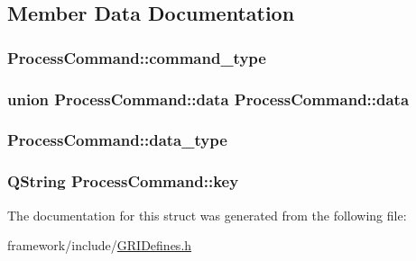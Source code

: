 \subsection{\-Member \-Data \-Documentation}
\hypertarget{structProcessCommand_afd8289b0435d3562920eb84a543bc88b}{
\subsubsection[{command\-\_\-type}]{ {\bf \-Process\-Command\-::command\-\_\-type}}}\label{structProcessCommand_afd8289b0435d3562920eb84a543bc88b}
\hypertarget{structProcessCommand_acc38e81f24ae355107ba38783ef6072a}{
\subsubsection[{data}]{\setlength{\rightskip}{0pt plus 5cm}union {\bf \-Process\-Command\-::data}  {\bf \-Process\-Command\-::data}}}\label{structProcessCommand_acc38e81f24ae355107ba38783ef6072a}
\hypertarget{structProcessCommand_ab1d813eb015c2f47b403c295398a2c77}{
\subsubsection[{data\-\_\-type}]{ {\bf \-Process\-Command\-::data\-\_\-type}}}\label{structProcessCommand_ab1d813eb015c2f47b403c295398a2c77}
\hypertarget{structProcessCommand_a376dd352cdec30077d0d5e69957d4ea4}{
\subsubsection[{key}]{\setlength{\rightskip}{0pt plus 5cm}\-Q\-String {\bf \-Process\-Command\-::key}}}\label{structProcessCommand_a376dd352cdec30077d0d5e69957d4ea4}


\-The documentation for this struct was generated from the following file\-:\begin{DoxyCompactItemize}
\item 
framework/include/\hyperlink{GRIDefines_8h}{\-G\-R\-I\-Defines.\-h}\end{DoxyCompactItemize}
